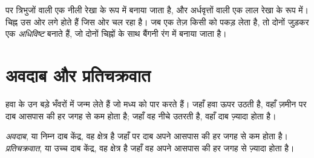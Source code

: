   पर  त्रिभुजों वाली एक नीली रेखा के रूप में बनाया जाता है, और
 अर्धवृत्तों वाली एक लाल रेखा के रूप में। चिह्न उस ओर लगे होते हैं जिस ओर
 चल रहा है। जब एक तेज़  किसी  को पकड़ लेता है, तो दोनों
जुड़कर एक \emph{अधिविष्ट } बनाते हैं, जो दोनों चिह्नों के साथ बैंगनी रंग में
बनाया जाता है।

\section{अवदाब और प्रतिचक्रवात}

 हवा के उन बड़े भँवरों में जन्म लेते हैं जो मध्य  को पार करते हैं। जहाँ
हवा ऊपर उठती है, वहाँ ज़मीन पर दाब आसपास की हर जगह से कम होता है; जहाँ वह नीचे उतरती
है, वहाँ दाब ज़्यादा होता है।

\begin{definition}[अवदाब और प्रतिचक्रवात]\label{def:g8:fronts-and-weather-maps:depression}
\emph{अवदाब}, या निम्न दाब केंद्र, वह क्षेत्र है जहाँ 
पर दाब अपने आसपास की हर जगह से कम होता है। \emph{प्रतिचक्रवात},
या उच्च दाब केंद्र, वह क्षेत्र है जहाँ वह अपने आसपास की हर जगह से ज़्यादा होता
है।
\end{definition}
\label{def:g8:fronts-and-weather-maps:anticyclone}

